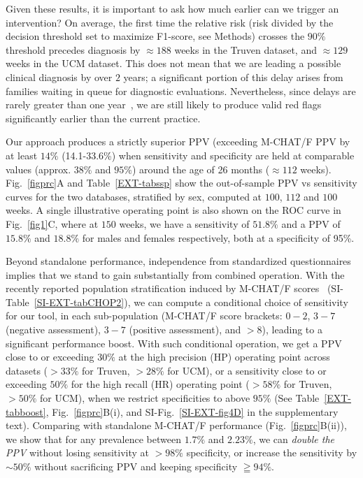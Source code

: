 \documentclass[3p,super,numbers,sort&compress,10pt]{elsarticle}
\begin{document}
Given these results, it is important to ask how much earlier can we trigger an intervention? On average,  the first time the relative risk (risk divided by the decision threshold set to maximize F1-score, see Methods) crosses the $90\%$ threshold precedes  diagnosis by  $\approx 188$ weeks in the Truven dataset, and $\approx 129$ weeks in the UCM dataset. This does not mean that we are   leading a possible clinical diagnosis by over $2$ years; a significant portion of this delay arises from families waiting in queue for diagnostic evaluations. Nevertheless, since delays are rarely greater than   one year~\cite{gordon2016whittling},  we are still likely to produce valid red flags significantly earlier than the current practice.%

Our approach produces a strictly superior PPV (exceeding M-CHAT/F PPV by at  least $14\%$ (14.1-33.6\%) when sensitivity and specificity are held at comparable values (approx. $38\%$ and $95\%$) around the age of 26 months ($\approx 112$ weeks). Fig.~\ref{figprc}A and Table~\ref{EXT-tabssp} show  the out-of-sample  PPV vs sensitivity curves   for the two databases, stratified by sex, computed at $100$, $112$ and $100$ weeks. A single illustrative operating point is also shown on the ROC curve in Fig.~\ref{fig1}C, where at $150$ weeks, we have a sensitivity of $51.8\%$ and a PPV of $15.8\%$ and $18.8\%$ for males and females respectively, both at a specificity of 95\%. 

Beyond standalone performance, independence from standardized questionnaires implies that we stand to gain substantially  from combined operation. With the recently reported population stratification induced by M-CHAT/F scores~\cite{pmid31562252} (SI-Table~\ref{SI-EXT-tabCHOP2}), we can compute a conditional choice of sensitivity  for our tool, in each sub-population (M-CHAT/F score brackets: $0-2$, $3-7$ (negative assessment), $3-7$ (positive assessment), and $>8$), leading to a  significant performance boost. With such conditional operation, we get a PPV close to or exceeding $30\%$ at the high precision (HP) operating point across datasets ($>33\%$ for Truven, $>28\%$ for UCM), or a sensitivity close to or exceeding $50\%$ for the high recall (HR) operating point ($>58\%$ for  Truven, $>50\%$ for UCM), when we restrict specificities to above $95\%$ (See Table~\ref{EXT-tabboost}, Fig.~\ref{figprc}B(i), and SI-Fig.~\ref{SI-EXT-fig4D}  in the supplementary text). Comparing   with standalone M-CHAT/F performance (Fig.~\ref{figprc}B(ii)), we show that for any prevalence between $1.7\%$ and $2.23\%$, we can   \textit{double the PPV} without losing sensitivity at $>98\%$ specificity, or increase the sensitivity by $\sim 50\%$ without sacrificing PPV and  keeping specificity $\geqq 94\%$.%
\end{document}
